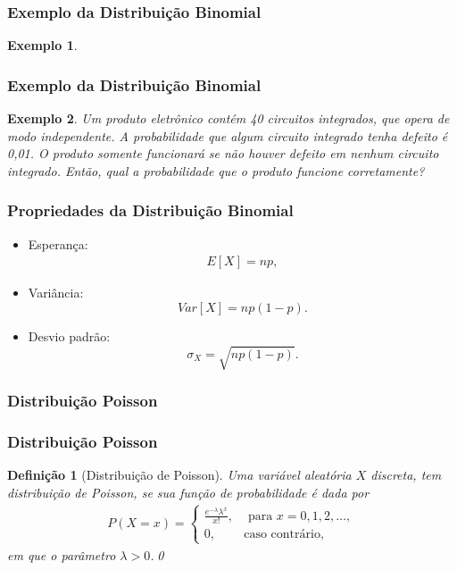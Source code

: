 \documentclass{beamer}
\theoremstyle{plain}
\newtheorem{exem}{Exemplo}
\newtheorem{defi}{Definição}
\begin{document}
  \begin{frame}
  	\frametitle{Exemplo da Distribuição Binomial}
  	\begin{exem}
  		\centering
  	\end{exem}
  \end{frame}

  \begin{frame}
  	\frametitle{Exemplo da Distribuição Binomial}
  	\begin{exem}
  		Um produto eletrônico contém 40 circuitos integrados, que opera de modo independente. A probabilidade que algum circuito integrado tenha defeito é 0,01. O produto somente funcionará se não houver defeito em nenhum circuito integrado. Então, qual a probabilidade que o produto funcione corretamente?
  	\end{exem}
  \end{frame}

  \begin{frame}
  	\frametitle{Propriedades da Distribuição Binomial}
  	\begin{itemize}
  		\item Esperança:
  		\begin{align}
  		E[X] = np,
  		\end{align}
  		\item Variância:
  		\begin{equation}
  		Var[X]=np(1 - p).
  		\end{equation}
  		\item Desvio padrão:
  		\begin{equation}
  		\sigma_X = \sqrt{np(1 - p)}.
  		\end{equation}
  	\end{itemize}
  \end{frame}


  \begin{frame}
  	\frametitle{Distribuição Poisson}
  	\begin{center}
  	\end{center}
  \end{frame}

  \begin{frame}
  	\frametitle{Distribuição Poisson}
  	\begin{defi}[Distribuição de Poisson]
  		Uma variável aleatória $X$ discreta, tem distribuição de Poisson, se sua função de probabilidade é dada por
  		\begin{eqnarray}\label{eq:poisson}
  		P(X=x)=\left\lbrace \begin{array}{ll}
  		\frac{e^{-\lambda}\lambda^{x}}{x!},& \textrm{ para } x= 0,1,2,\ldots,\\
  		0,& \textrm{caso contrário},
  		\end{array}\right.
  		\end{eqnarray}
  		em que o parâmetro $\lambda > 0$.\qed
  	\end{defi}
  \end{frame}
\end{document}
